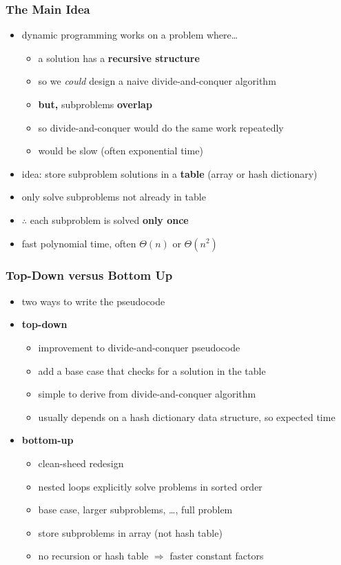 \documentclass{beamer}
\begin{document}
\begin{frame} \frametitle{The Main Idea}
  \begin{itemize}
    \item dynamic programming works on a problem where\dots
    \begin{itemize}
      \item a solution has a \textbf{recursive structure}
      \item so we \emph{could} design a naive divide-and-conquer algorithm
      \item \textbf{but,} subproblems \textbf{overlap}
      \item so divide-and-conquer would do the same work repeatedly
      \item would be slow (often exponential time)
    \end{itemize}
    \item idea: store subproblem solutions in a \textbf{table} (array or hash dictionary)
    \item only solve subproblems not already in table
    \item $\therefore$ each subproblem is solved \textbf{only once}
    \item fast polynomial time, often $\Theta(n)$ or $\Theta(n^2)$
  \end{itemize}
\end{frame}

\begin{frame} \frametitle{Top-Down versus Bottom Up}
  \begin{itemize}
    \item two ways to write the pseudocode
    \item \textbf{top-down}
    \begin{itemize}
      \item improvement to divide-and-conquer pseudocode
      \item add a base case that checks for a solution in the table
      \item simple to derive from divide-and-conquer algorithm
      \item usually depends on a hash dictionary data structure, so expected time
    \end{itemize}
    \item \textbf{bottom-up}
    \begin{itemize}
      \item clean-sheed redesign
      \item nested loops explicitly solve problems in sorted order
      \item base case, larger subproblems, \dots, full problem
      \item store subproblems in array (not hash table)
      \item no recursion or hash table $\Rightarrow$ faster constant factors
    \end{itemize}
  \end{itemize}
\end{frame}
\end{document}
